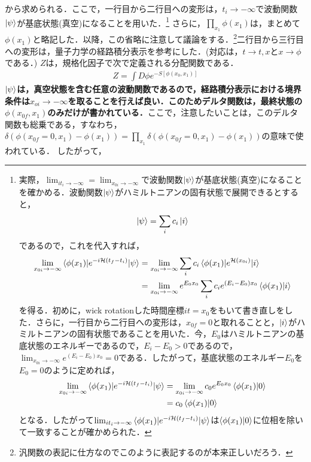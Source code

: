 から求められる．ここで，一行目から二行目への変形は，$t_i\to -\infty$で波動関数$\ket{\psi}$が基底状態(真空)になることを用いた．\footnote{実際，$\lim_{it_i\to -\infty}=\lim_{x_{0i}\to -\infty}$で波動関数$\ket{\psi}$が基底状態(真空)になることを確かめる．波動関数$\ket{\psi}$がハミルトニアンの固有状態で展開できるとすると，
\begin{align}
  \ket{\psi}=\sum_{i}c_{i}\ket{i}
\end{align}
であるので，これを代入すれば，
\begin{align}
  \lim_{x_{0i}\to -\infty}\braket{\phi(x_1)|e^{-i\mathcal
  {H}(t_f-t_i)}|\psi}&=\lim_{x_{0i}\to -\infty}\sum_{i}c_{i}\braket{\phi(x_1)|e^{\mathcal
  {H}(x_{0i})}|i}\\
  &=\lim_{x_{0i}\to -\infty}e^{E_0x_0}\sum_{i}c_{i}e^{(E_i-E_0)x_0}\braket{\phi(x_1)|i}
\end{align}
を得る．初めに，wick rotationした時間座標$it=x_0$をもいて書き直しをした．さらに，一行目から二行目への変形は，$x_{0f}=0$と取れることと，$\ket{i}$がハミルトニアンの固有状態であることを用いた．今，$E_0$はハミルトニアンの基底状態のエネルギーであるので，$E_{i}-E_0>0$であるので，$\lim_{x_{0i} \to -\infty}e^{(E_i-E_0)x_0}=0$である．したがって，基底状態のエネルギー$E_0$を$E_0=0$のように定めれば，
\begin{align}
  \lim_{x_{0i}\to -\infty}\braket{\phi(x_1)|e^{-i\mathcal
  {H}(t_f-t_i)}|\psi}&=\lim_{x_{0i}\to -\infty}c_0e^{E_0x_0}\braket{\phi(x_1)|0}\\
  &=c_0\braket{\phi(x_1)|0}
\end{align}
となる．したがって$\lim_{it_i\to -\infty}\braket{\phi(x_1)|e^{-i\mathcal
{H}(t_f-t_i)}|\psi}$は$\braket{\phi(x_1)|0}$に位相を除いて一致することが確かめられた．}
さらに，$\prod_{x_1}\phi(x_1)$は，まとめて$\phi(x_1)$と略記した．以降，この省略に注意して議論をする．\footnote{汎関数の表記に仕方なのでこのように表記するのが本来正しいだろう．}二行目から三行目への変形は，量子力学の経路積分表示を参考にした．(対応は，$t\rightarrow t,x$と$x\rightarrow \phi$である．)
$Z$は，規格化因子で次で定義される分配関数である．
\begin{align}
  Z=\int D\phi e^{-S[\phi(x_0,x_1)]}
\end{align}
\textbf{$\ket{\psi}$は，真空状態を含む任意の波動関数であるので，経路積分表示における境界条件は$x_{oi}\to -\infty$を取ることを行えば良い．このためデルタ関数は，最終状態の$\phi(x_{0f},x_1)$のみだけが書かれている．}ここで，注意したいことは，このデルタ関数も総乗である，すなわち，
$\delta(\phi(x_{0f}=0,x_1)-\phi(x_1))=\prod_{x_1}\delta(\phi(x_{0f}=0,x_1)-\phi(x_1))$の意味で使われている． したがって，

